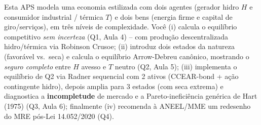 \documentclass[11pt,addpoints]{exam}
\begin{document}
\begin{contextbox}
Esta APS modela uma economia estilizada com dois agentes (gerador hidro $H$ e consumidor industrial / térmica $T$) e dois bens (energia firme e capital de giro/serviços), em três níveis de complexidade. Você (i) calcula o equilíbrio competitivo \emph{sem incerteza} (Q1, Aula 4) -- com produção descentralizada hidro/térmica via Robinson Crusoe; (ii) introduz dois estados da natureza (favorável vs.\ seca) e calcula o equilíbrio Arrow-Debreu canônico, mostrando o \emph{seguro completo} entre $H$ avesso e $T$ neutro (Q2, Aula 5); (iii) implementa o equilíbrio de Q2 via Radner sequencial com 2 ativos (CCEAR-bond + ação contingente hidro), depois amplia para 3 estados (com seca extrema) e diagnostica a \textbf{incompletude} de mercado e a Pareto-ineficiência genérica de Hart (1975) (Q3, Aula 6); finalmente (iv) recomenda à ANEEL/MME um redesenho do MRE pós-Lei 14.052/2020 (Q4).


\end{contextbox}
\end{document}
